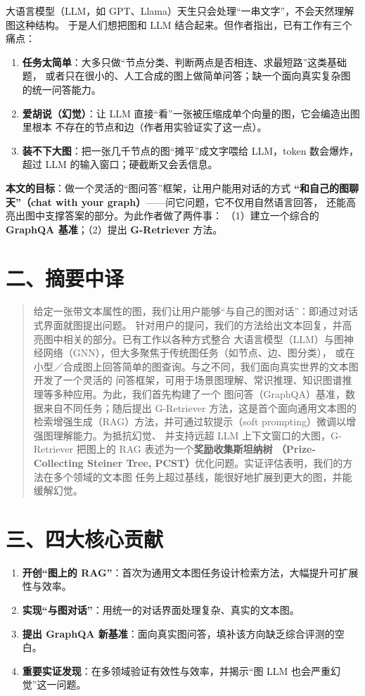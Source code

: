 \documentclass[11pt,UTF8,fontset=fandol]{ctexart}
\begin{document}
大语言模型（LLM，如 GPT、Llama）天生只会处理“一串文字”，不会天然理解图这种结构。
于是人们想把图和 LLM 结合起来。但作者指出，已有工作有三个痛点：

\begin{enumerate}[leftmargin=2em]
  \item \textbf{任务太简单}：大多只做“节点分类、判断两点是否相连、求最短路”这类基础题，
        或者只在很小的、人工合成的图上做简单问答；缺一个面向真实复杂图的统一问答能力。
  \item \textbf{爱胡说（幻觉）}：让 LLM 直接“看”一张被压缩成单个向量的图，它会编造出图里根本
        不存在的节点和边（作者用实验证实了这一点）。
  \item \textbf{装不下大图}：把一张几千节点的图“摊平”成文字喂给 LLM，token 数会爆炸，
        超过 LLM 的输入窗口；硬截断又会丢信息。
\end{enumerate}

\textbf{本文的目标}：做一个灵活的“图问答”框架，让用户能用对话的方式
\textbf{“和自己的图聊天”（chat with your graph）}——问它问题，它不仅用自然语言回答，
还能高亮出图中支撑答案的部分。为此作者做了两件事：
（1）建立一个综合的 \textbf{GraphQA 基准}；（2）提出 \textbf{G-Retriever} 方法。

\section{二、摘要中译}

\begin{quote}
给定一张带文本属性的图，我们让用户能够“与自己的图对话”：即通过对话式界面就图提出问题。
针对用户的提问，我们的方法给出文本回复，并高亮图中相关的部分。已有工作以各种方式整合
大语言模型（LLM）与图神经网络（GNN），但大多聚焦于传统图任务（如节点、边、图分类），
或在小型／合成图上回答简单的图查询。与之不同，我们面向真实世界的文本图开发了一个灵活的
问答框架，可用于场景图理解、常识推理、知识图谱推理等多种应用。为此，我们首先构建了一个
图问答（GraphQA）基准，数据来自不同任务；随后提出 G-Retriever 方法，这是首个面向通用文本图的
检索增强生成（RAG）方法，并可通过软提示（soft prompting）微调以增强图理解能力。为抵抗幻觉、
并支持远超 LLM 上下文窗口的大图，G-Retriever 把图上的 RAG 表述为一个\textbf{奖励收集斯坦纳树
（Prize-Collecting Steiner Tree, PCST）}优化问题。实证评估表明，我们的方法在多个领域的文本图
任务上超过基线，能很好地扩展到更大的图，并能缓解幻觉。
\end{quote}

\section{三、四大核心贡献}
\begin{enumerate}[leftmargin=2em]
  \item \textbf{开创“图上的 RAG”}：首次为通用文本图任务设计检索方法，大幅提升可扩展性与效率。
  \item \textbf{实现“与图对话”}：用统一的对话界面处理复杂、真实的文本图。
  \item \textbf{提出 GraphQA 新基准}：面向真实图问答，填补该方向缺乏综合评测的空白。
  \item \textbf{重要实证发现}：在多领域验证有效性与效率，并揭示“图 LLM 也会严重幻觉”这一问题。
\end{enumerate}
\end{document}

